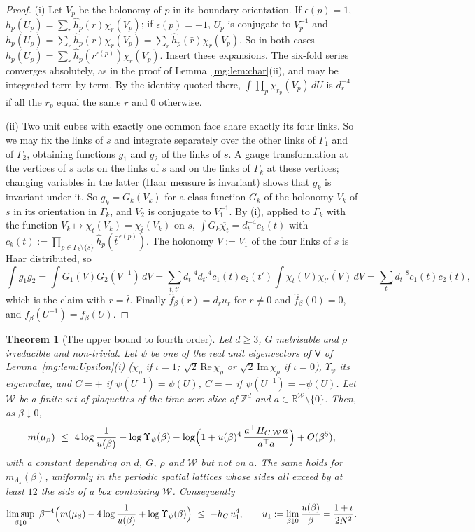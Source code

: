 \documentclass[11pt,a4paper]{article}
\newtheorem{theorem}{Theorem}[section]
\theoremstyle{definition}
\theoremstyle{remark}
\newcommand{\R}{\mathbb{R}}
\newcommand{\Z}{\mathbb{Z}}
\newcommand{\dU}{\,dU}
\begin{document}
\begin{proof}
(i) Let $V_p$ be the holonomy of $p$ in its boundary orientation. If $\epsilon(p)=1$, $h_p(U_p)=\sum_r\hat h_p(r)\chi_r(V_p)$; if $\epsilon(p)=-1$, $U_p$ is
conjugate to $V_p^{-1}$ and $h_p(U_p)=\sum_r\hat h_p(r)\chi_{\bar r}(V_p)=\sum_r\hat h_p(\bar r)\chi_r(V_p)$. So in both cases
$h_p(U_p)=\sum_r\hat h_p(r^{\epsilon(p)})\chi_r(V_p)$. Insert these expansions. The six-fold series converges absolutely, as in the proof of
Lemma~\ref{mg:lem:char}(ii), and may be integrated term by term. By the identity quoted there, $\int\prod_p\chi_{r_p}(V_p)\dU$ is $d_r^{-4}$ if all the $r_p$
equal the same $r$ and $0$ otherwise.

(ii) Two unit cubes with exactly one common face share exactly its four links. So we may fix the links of $s$ and integrate separately over the other links
of $\Gamma_1$ and of $\Gamma_2$, obtaining functions $g_1$ and $g_2$ of the links of $s$. A gauge transformation at the vertices of $s$ acts on the links of $s$
and on the links of $\Gamma_k$ at these vertices; changing variables in the latter (Haar measure is invariant) shows that $g_k$ is invariant under it. So
$g_k=G_k(V_k)$ for a class function $G_k$ of the holonomy $V_k$ of $s$ in its orientation in $\Gamma_k$, and $V_2$ is conjugate to $V_1^{-1}$. By (i),
applied to $\Gamma_k$ with the function $V_k\mapsto\overline{\chi_t(V_k)}=\chi_{\bar t}(V_k)$ on $s$, $\int G_k\overline{\chi_t}=d_t^{-4}c_k(t)$ with
$c_k(t):=\prod_{p\in\Gamma_k\setminus\{s\}}\hat h_p(\bar t^{\,\epsilon(p)})$. The holonomy $V:=V_1$ of the four links of $s$ is Haar distributed, so
\[
\int g_1g_2=\int G_1(V)G_2(V^{-1})\,dV=\sum_{t,t'}d_t^{-4}d_{t'}^{-4}c_1(t)c_2(t')\int\chi_t(V)\overline{\chi_{t'}(V)}\,dV=\sum_td_t^{-8}c_1(t)c_2(t),
\]
which is the claim with $r=\bar t$. Finally $\hat f_\beta(r)=d_ru_r$ for $r\neq0$ and $\hat f_\beta(0)=0$, and $f_\beta(U^{-1})=f_\beta(U)$.
\end{proof}

\begin{theorem}[The upper bound to fourth order]\label{mg:thm:upper4}
Let $d\ge3$, $G$ metrisable and $\rho$ irreducible and non-trivial. Let $\psi$ be one of the real unit eigenvectors of $\mathsf V$ of
Lemma~\ref{mg:lem:Upsilon}(i) ($\chi_\rho$ if $\iota=1$; $\sqrt2\,\mathrm{Re}\,\chi_\rho$ or $\sqrt2\,\mathrm{Im}\,\chi_\rho$ if $\iota=0$), $\Upsilon_\psi$ its eigenvalue,
and $C=+$ if $\psi(U^{-1})=\psi(U)$, $C=-$ if $\psi(U^{-1})=-\psi(U)$. Let $\mathcal W$ be a finite set of plaquettes of the time-zero slice of $\Z^d$ and
$a\in\R^{\mathcal W}\setminus\{0\}$. Then, as $\beta\downarrow0$,
\[
m(\mu_\beta)\ \le\ 4\log\frac1{u(\beta)}-\log\Upsilon_\psi(\beta)-\log\Bigl(1+u(\beta)^4\,\frac{a^\top H_{C,\mathcal W}\,a}{a^\top a}\Bigr)+O(\beta^5),
\]
with a constant depending on $d$, $G$, $\rho$ and $\mathcal W$ but not on $a$. The same holds for $m_{\Lambda_s}(\beta)$, uniformly in the periodic spatial lattices whose
sides all exceed by at least $12$ the side of a box containing $\mathcal W$. Consequently
\[
\limsup_{\beta\downarrow0}\ \beta^{-4}\Bigl(m(\mu_\beta)-4\log\frac1{u(\beta)}+\log\Upsilon_\psi(\beta)\Bigr)\ \le\ -h_C\,u_1^4,\qquad
u_1:=\lim_{\beta\downarrow0}\frac{u(\beta)}\beta=\frac{1+\iota}{2N^2}.
\]
\end{theorem}
\end{document}
